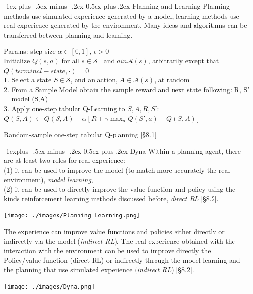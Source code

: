 \documentclass[10pt,landscape]{article}
\makeatletter
\renewcommand{\section}{\@startsection{section}{1}{0mm}%
                                {-1ex plus -.5ex minus -.2ex}%
                                {0.5ex plus .2ex}%
                                {\normalfont\large\bfseries}}
\renewcommand{\subsection}{\@startsection{subsection}{2}{0mm}%
                                {-1explus -.5ex minus -.2ex}%
                                {0.5ex plus .2ex}%
                                {\normalfont\normalsize\bfseries}}
\makeatother
\begin{document}
\begin{multicols}{3}
\section{Planning and Learning}
Planning methods use simulated experience generated by a model, learning methods use real experience generated by the environment. 
Many ideas and algorithms can be transferred between planning and learning.

\begin{algorithm}[H]
 Params: step size $\alpha \in [0,1]$, $\epsilon > 0$\\
 Initialize $Q(s,a)$ for all $s \in \mathcal{S}^+$ and $a in \mathcal{A}(s)$, arbitrarily except that $Q(terminal-state, \cdot) = 0$\\
{
	1. Select a state $S \in \mathcal{S}$, and an action, $A \in \mathcal{A}(s)$, at random\\
	2. From a Sample Model obtain the sample reward and next state following: R, S' = model (S,A)\\
	3. Apply one-step tabular Q-Learning to $S, A, R, S'$:\\
	$Q(S, A) \leftarrow Q(S, A) + \alpha \left[R + \gamma \max_a Q(S', a) - Q(S, A)  \right]$\\
 }
\caption{Random-sample one-step tabular Q-planning [§8.1]}
\end{algorithm}

\subsection{Dyna}
Within a planning agent, there are at least two roles for real experience: \\
(1) it can be used to improve the model (to match more accurately the real environment), \emph{model learning},\\ 
(2) it can be used to directly improve the value function and policy using the kinds reinforcement learning methods discussed before, \emph{direct RL} [§8.2].\\
\begin{center}
\texttt{[image: ./images/Planning-Learning.png]}
\end{center}
The experience can improve value functions and policies either directly or indirectly via the model (\emph{indirect RL}).
The real experience obtained with the interaction with the environment can be used to improve directly the Policy/value function (direct RL) or indirectly through the model learning and the planning that use simulated experience (\emph{indirect RL}) [§8.2].\\
\begin{center}
\texttt{[image: ./images/Dyna.png]}
\end{center}


\end{multicols}
\end{document}
